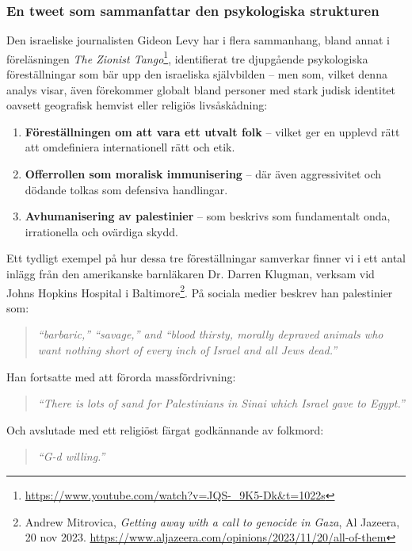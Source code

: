 \subsubsection{En tweet som sammanfattar den psykologiska strukturen}

Den israeliske journalisten Gideon Levy har i flera sammanhang, bland annat i föreläsningen \textit{The Zionist Tango}\footnote{\url{https://www.youtube.com/watch?v=JQS-_9K5-Dk&t=1022s}}, identifierat tre djupgående psykologiska föreställningar som bär upp den israeliska självbilden – men som, vilket denna analys visar, även förekommer globalt bland personer med stark judisk identitet oavsett geografisk hemvist eller religiös livsåskådning:

\begin{enumerate}
    \item \textbf{Föreställningen om att vara ett utvalt folk} – vilket ger en upplevd rätt att omdefiniera internationell rätt och etik.
    \item \textbf{Offerrollen som moralisk immunisering} – där även aggressivitet och dödande tolkas som defensiva handlingar.
    \item \textbf{Avhumanisering av palestinier} – som beskrivs som fundamentalt onda, irrationella och ovärdiga skydd.
\end{enumerate}

Ett tydligt exempel på hur dessa tre föreställningar samverkar finner vi i ett antal inlägg från den amerikanske barnläkaren Dr. Darren Klugman, verksam vid Johns Hopkins Hospital i Baltimore\footnote{Andrew Mitrovica, \textit{Getting away with a call to genocide in Gaza}, Al Jazeera, 20 nov 2023. \url{https://www.aljazeera.com/opinions/2023/11/20/all-of-them}}. På sociala medier beskrev han palestinier som:

\begin{quote}
\textit{“barbaric,” “savage,” and “blood thirsty, morally depraved animals who want nothing short of every inch of Israel and all Jews dead.”}
\end{quote}

Han fortsatte med att förorda massfördrivning:
\begin{quote}
\textit{“There is lots of sand for Palestinians in Sinai which Israel gave to Egypt.”}
\end{quote}

Och avslutade med ett religiöst färgat godkännande av folkmord:
\begin{quote}
\textit{“G-d willing.”}
\end{quote}


